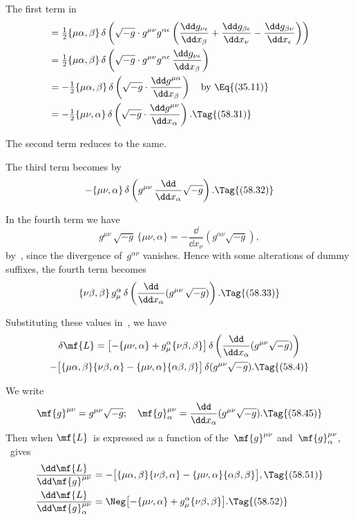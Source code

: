 \documentclass[12pt]{book}
\begin{document}
The first term in~
\begin{align*}
  &= \tfrac{1}{2} \{\mu\alpha, \beta\}\, \delta\left(\sqrt{-g} \cdot g^{\mu\nu} g^{\alpha\epsilon}
  \left(\frac{\dd g_{\nu\epsilon}}{\dd x_{\beta}}
  + \frac{\dd g_{\beta\epsilon}}{\dd x_{\nu}}
  - \frac{\dd g_{\beta\nu}}{\dd x_{\epsilon}}\right)\right) \\
  &= \tfrac{1}{2} \{\mu\alpha, \beta\}\, \delta\left(\sqrt{-g} \cdot g^{\mu\nu} g^{\alpha\epsilon}\, \frac{\dd g_{\nu\epsilon}}{\dd x_{\beta}}\right) \\
  &= -\tfrac{1}{2} \{\mu\alpha, \beta\}\, \delta\left(\sqrt{-g} \cdot \frac{\dd g^{\mu\alpha}}{\dd x_{\beta}}\right)
  \quad\text{by \Eq{(35.11)}} \\
  &= -\tfrac{1}{2} \{\mu\nu, \alpha\}\, \delta\left(\sqrt{-g} \cdot \frac{\dd g^{\mu\nu}}{\dd x_{\alpha}}\right).
  \Tag{(58.31)}
\end{align*}

The second term reduces to the same.

The third term becomes by~
\[
-\{\mu\nu, \alpha\}\, \delta\left(g^{\mu\nu}\, \frac{\dd}{\dd x_{\alpha}} \sqrt{-g}\right).
\Tag{(58.32)}
\]

In the fourth term we have
\[
g^{\mu\nu}\, \sqrt{-g}\, \{\mu\nu, \alpha\}
= -\frac{\dd}{\dd x_{\nu}}(g^{\alpha\nu} \sqrt{-g}),
\]
by~, since the divergence of~$g^{\alpha\nu}$ vanishes. Hence with some alterations
of dummy suffixes, the fourth term becomes
\[
\{\nu\beta, \beta\}\, g_{\mu}^{\alpha}\, \delta\left(\frac{\dd}{\dd x_{\alpha}} (g^{\mu\nu}\, \sqrt{-g})\right).
\Tag{(58.33)}
\]

Substituting these values in~, we have
\begin{multline*}
  \delta\mf{L} = \bigl[-\{\mu\nu, \alpha\} + g_{\mu}^{\alpha} \{\nu\beta, \beta\}\bigr]\,
  \delta\left(\frac{\dd}{\dd x_{\alpha}} (g^{\mu\nu} \sqrt{-g})\right) \\
  - \bigl[\{\mu\alpha, \beta\} \{\nu\beta, \alpha\} - \{\mu\nu, \alpha\} \{\alpha\beta, \beta\}\bigr]\,
  \delta(g^{\mu\nu} \sqrt{-g}).
  \Tag{(58.4)}
\end{multline*}

We write
\[
\mf{g}^{\mu\nu} = g^{\mu\nu} \sqrt{-g};\quad
\mf{g}_{\alpha}^{\mu\nu} = \frac{\dd}{\dd x_{\alpha}} (g^{\mu\nu} \sqrt{-g}).
\Tag{(58.45)}
\]
Then when $\mf{L}$~is expressed as a function of the~$\mf{g}^{\mu\nu}$ and~$\mf{g}_{\alpha}^{\mu\nu}$, ~gives
\begin{align*}
  \frac{\dd\mf{L}}{\dd\mf{g}^{\mu\nu}}
  &= -\bigl[\{\mu\alpha, \beta\} \{\nu\beta, \alpha\} - \{\mu\nu, \alpha\} \{\alpha\beta, \beta\}\bigr],
  \Tag{(58.51)} \\
  \frac{\dd\mf{L}}{\dd\mf{g}_{\alpha}^{\mu\nu}}
  &= \Neg\bigl[-\{\mu\nu, \alpha\} + g_{\mu}^{\alpha} \{\nu\beta, \beta\}\bigr].
  \Tag{(58.52)}
\end{align*}
\end{document}
